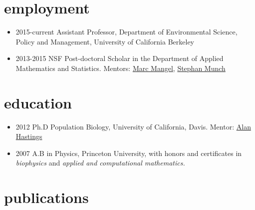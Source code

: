 \documentclass[10pt,sans]{moderncv}        %
\providecommand{\tightlist}{%
    \setlength{\itemsep}{0pt}\setlength{\parskip}{0pt}}
\begin{document}
\makecvtitle

\section{employment}\label{employment}

\begin{itemize}
\tightlist
\item
  2015-current Assistant Professor, Department of Environmental Science,
  Policy and Management, University of California Berkeley
\item
  2013-2015 NSF Post-doctoral Scholar in the Department of Applied
  Mathematics and Statistics. Mentors:
  \href{http://users.soe.ucsc.edu/~msmangel/}{Marc Mangel},
  \href{http://swfsc.noaa.gov/staff.aspx?\&id=17294}{Stephan Munch}
\end{itemize}

\section{education}\label{education}

\begin{itemize}
\item
  2012 Ph.D Population Biology, University of California, Davis. Mentor:
  \href{http://two.ucdavis.edu/~me}{Alan Hastings}
\item
  2007 A.B in Physics, Princeton University, with honors and
  certificates in \emph{biophysics} and \emph{applied and computational
  mathematics.}
\end{itemize}

\section{publications}\label{publications}
\end{document}
